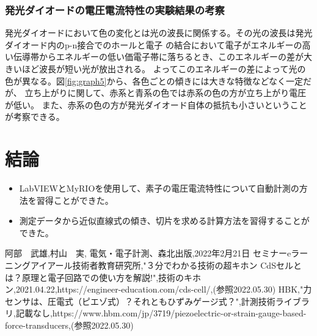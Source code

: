 \documentclass[11pt,dvipdfmx]{jarticle}
\begin{document}
	\subsubsection{発光ダイオードの電圧電流特性の実験結果の考察}
	発光ダイオードにおいて色の変化とは光の波長に関係する。その光の波長は発光ダイオード内のp-n接合でのホールと電子
	の結合において電子がエネルギーの高い伝導帯からエネルギーの低い価電子帯に落ちるとき、このエネルギーの差が大きいほど波長が短い光が放出される。
	よってこのエネルギーの差によって光の色が異なる。図\ref{fig:graph5}から、各色ごとの傾きには大きな特徴などなく一定だが、
	立ち上がりに関して、赤系と青系の色では赤系の色の方が立ち上がり電圧が低い。
	また、赤系の色の方が発光ダイオード自体の抵抗も小さいということが考察できる。


\section{結論}
\begin{itemize}
	\item LabVIEWとMyRIOを使用して、素子の電圧電流特性について自動計測の方法を習得ことができた。
	\item 測定データから近似直線式の傾き、切片を求める計算方法を習得することができた。
\end{itemize}

\begin{thebibliography}{9}%
	 阿部　武雄,村山　実, 電気・電子計測、森北出版,2022年2月21日
	 セミナーeラーニングアイアール技術者教育研究所,"３分でわかる技術の超キホン CdSセルとは？原理と電子回路での使い方を解説!",技術のキホン,2021.04.22,https://engineer-education.com/cds-cell/,(参照2022.05.30)
	 HBK,"力センサは、圧電式（ピエゾ式）？それともひずみゲージ式？",計測技術ライブラリ,記載なし,https://www.hbm.com/jp/3719/piezoelectric-or-strain-gauge-based-force-transducers,(参照2022.05.30)

\end{thebibliography}
\end{document}
